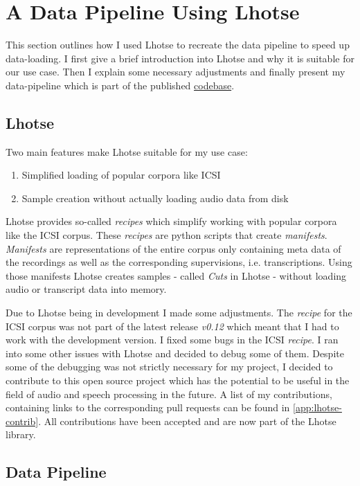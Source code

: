 \documentclass[bsc,frontabs,parskip,deptreport]{infthesis}
\newcommand{\coderepo}{\href{https://github.com/LasseWolter/laughter-detection-icsi}{codebase}}
\begin{document}
\section{A Data Pipeline Using Lhotse}
This section outlines how I used Lhotse to recreate the data pipeline to speed up data-loading. I first give a brief introduction into Lhotse and why it is suitable for our use case. Then I explain some necessary adjustments and finally present my data-pipeline which is part of the published \coderepo.

\subsection{Lhotse} \label{sec:lhotse}
Two main features make Lhotse suitable for my use case:
\begin{enumerate}
    \item Simplified loading of popular corpora like ICSI
    \item Sample creation without actually loading audio data from disk
\end{enumerate}

Lhotse provides so-called \textit{recipes} which simplify working with popular corpora like the ICSI corpus.
These \textit{recipes} are python scripts that create \textit{manifests}.
\textit{Manifests} are representations of the entire corpus only containing meta data of the recordings as well as the corresponding supervisions, i.e. transcriptions.
Using those manifests Lhotse creates samples - called \textit{Cuts} in Lhotse - without loading audio or transcript data into memory. 

Due to Lhotse being in development I made some adjustments. The \textit{recipe} for the ICSI corpus was not part of the latest release \textit{v0.12} which meant that I had to work with the development version. 
I fixed some bugs in the ICSI \textit{recipe}. 
I ran into some other issues with Lhotse and decided to debug some of them. Despite some of the debugging was not strictly necessary for my project, I decided to contribute to this open source project which has the potential to be useful in the field of audio and speech processing in the future. A list of my contributions, containing links to the corresponding pull requests can be found in \autoref{app:lhotse-contrib}. All contributions have been accepted and are now part of the Lhotse library.

\subsection{Data Pipeline} \label{sec:ml-data-pipeline}
\end{document}
